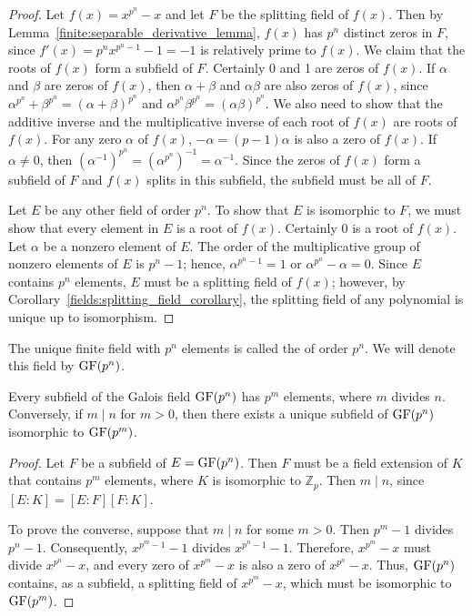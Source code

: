 \begin{proof}
Let $f(x) = x^{p^n} - x$ and let $F$ be the splitting field of $f(x)$.  Then by Lemma~\ref{finite:separable_derivative_lemma}, $f(x)$ has $p^n$ distinct zeros in $F$, since $f'(x) = p^n x^{p^n - 1} - 1 = -1$ is relatively prime to $f(x)$.  We claim that the roots of $f(x)$ form a subfield of $F$.  Certainly 0 and 1 are zeros of $f(x)$.  If $\alpha$ and $\beta$ are zeros of $f(x)$, then $\alpha + \beta$ and $\alpha \beta$ are also zeros of $f(x)$, since $\alpha^{p^n} + \beta^{p^n} =  (\alpha + \beta)^{p^n}$ and $\alpha^{p^n} \beta^{p^n} = (\alpha \beta)^{p^n}$. We also need to show that the additive inverse and the multiplicative inverse of each root of $f(x)$ are roots of $f(x)$.  For any zero $\alpha$ of $f(x)$, $-\alpha = (p - 1)\alpha$ is also a zero of $f(x)$. If $\alpha \neq 0$, then $(\alpha^{-1})^{p^n} = (\alpha^{p^n})^{-1} = \alpha^{-1}$. Since the zeros of $f(x)$ form a subfield of $F$ and $f(x)$ splits in this subfield, the subfield must be all of $F$. 

Let $E$ be any other field of order $p^n$.  To show that $E$ is isomorphic to $F$, we must show that every element in $E$ is a root of $f(x)$.  Certainly 0 is a root of $f(x)$.  Let $\alpha$ be a nonzero element of $E$.  The order of the multiplicative group of nonzero elements of $E$ is $p^n-1$; hence, $\alpha^{p^n-1} =1$ or $\alpha^{p^n} -\alpha = 0$.  Since $E$ contains $p^n$ elements, $E$ must be a splitting field of $f(x)$; however, by Corollary~\ref{fields:splitting_field_corollary}, the splitting field of any polynomial is unique up to isomorphism. 
\end{proof}
 
\medskip

The unique finite field with $p^n$ elements is called the  of order $p^n$. We will denote this field by $\operatorname{GF}(p^n)$\label{galoisfield}. 

\begin{theorem}\label{finite:subfields_theorem}
Every subfield of the Galois field $\operatorname{GF}(p^n)$ has $p^m$ elements, where $m$ divides $n$.  Conversely, if $m \mid n$ for $m > 0$, then  there exists a unique subfield of $\operatorname{GF}(p^n)$ isomorphic to  $\operatorname{GF}(p^m)$.
\end{theorem}

\begin{proof}
Let $F$ be a subfield of $E = \operatorname{GF}(p^n)$.  Then $F$ must be a field extension of $K$ that contains  $p^m$ elements, where $K$ is isomorphic to ${\mathbb Z}_p$.   Then $m \mid n$, since $[E:K] = [E:F][F:K]$.

To prove the converse, suppose that $m \mid n$ for some $m > 0$.  Then $p^m -1$ divides $p^n -1$. Consequently, $x^{p^m -1} - 1$ divides $x^{p^n -1} -1$. Therefore, $x^{p^m} - x$ must divide $x^{p^n} - x$, and every zero of $x^{p^m} - x$ is also a zero of $x^{p^n} - x$. Thus, $\operatorname{GF}(p^n)$ contains, as a subfield, a splitting field of $x^{p^m} - x$, which must be isomorphic to $\operatorname{GF}(p^m)$.
\end{proof}
     

